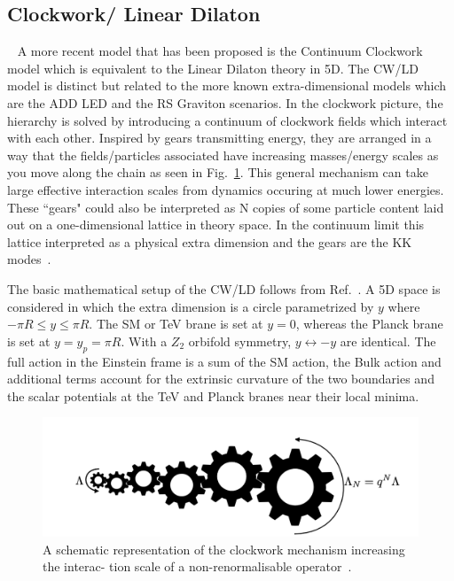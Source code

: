 \subsection{Clockwork/ Linear Dilaton}~\label{sec:CWmodel} 
A more recent model that has been proposed is the Continuum Clockwork model which is equivalent to the Linear Dilaton theory in 5D. The CW/LD model is distinct but related to the more known extra-dimensional models which are the ADD LED and the RS Graviton scenarios. In the clockwork picture, the hierarchy is solved by introducing a continuum of clockwork fields which interact with each other. Inspired by gears transmitting energy, they are arranged in a way that the fields/particles associated have increasing masses/energy scales as you move along the chain as seen in Fig.~\ref{fig:ClockworkSchematic}.
This general mechanism can take large effective interaction scales from dynamics occuring at much lower energies. These ``gears" could also be interpreted as N copies of some particle content laid out on a one-dimensional lattice in theory space. In the continuum limit this lattice interpreted as a physical extra dimension and the gears are the KK modes~\cite{2Clockwork}. 

The basic mathematical setup of the CW/LD follows from Ref.~\cite{Giudice:2017fmj}. A 5D space is considered in which the extra dimension is a circle parametrized by $y$ where $- \pi R \leq y \leq \pi R$. The SM or TeV brane is set at $y = 0 $, whereas the Planck brane is set at $y = y_p = \pi R$. With a $Z_2$ orbifold symmetry, $y\leftrightarrow-y$ are identical. The full action in the Einstein frame is a sum of the SM action, the Bulk action and additional terms account for the extrinsic curvature of the two boundaries and the scalar potentials at the TeV and Planck branes near their local minima.

\begin{figure}[ht]
    \centering
    \includegraphics[scale=0.5]{fig/ClockworkSchematic.png}
    \caption{A schematic representation of the clockwork mechanism increasing the interac-
tion scale of a non-renormalisable operator~\cite{2Clockwork}. }
    \label{fig:ClockworkSchematic}
\end{figure}

